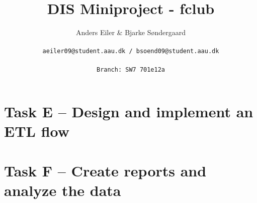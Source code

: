 \documentclass[a4paper,10pt]{article}
\title{DIS Miniproject - fclub}
\author{Anders Eiler \& Bjarke Søndergaard \\
\rule{0pt}{4ex}\texttt{aeiler09@student.aau.dk / bsoend09@student.aau.dk} \\
\rule{0pt}{4ex}\texttt{Branch: SW7 701e12a}}
\begin{document}
    \maketitle
    \newpage





    \section{Task E – Design and implement an ETL flow}
    

    \section{Task F – Create reports and analyze the data}
    
\end{document}
